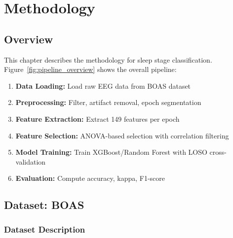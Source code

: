 \chapter{Methodology}
\label{ch:methodology}


\section{Overview}
\label{sec:method_overview}

This chapter describes the methodology for sleep stage classification. Figure~\ref{fig:pipeline_overview} shows the overall pipeline:

\begin{enumerate}
    \item \textbf{Data Loading:} Load raw EEG data from BOAS dataset
    \item \textbf{Preprocessing:} Filter, artifact removal, epoch segmentation
    \item \textbf{Feature Extraction:} Extract 149 features per epoch
    \item \textbf{Feature Selection:} ANOVA-based selection with correlation filtering
    \item \textbf{Model Training:} Train XGBoost/Random Forest with LOSO cross-validation
    \item \textbf{Evaluation:} Compute accuracy, kappa, F1-score
\end{enumerate}


\section{Dataset: BOAS}
\label{sec:dataset}

\subsection{Dataset Description}
\label{subsec:dataset_description}


